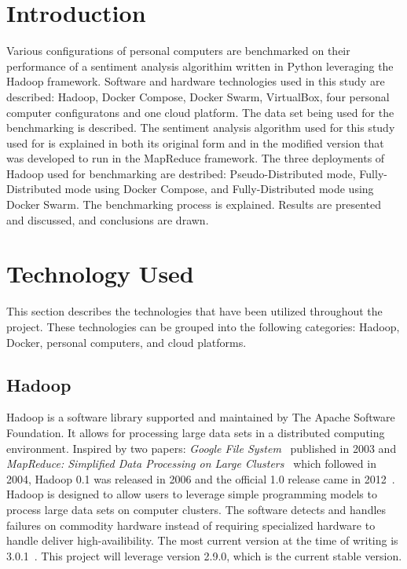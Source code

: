 \section{Introduction}\label{s:intro}
Various configurations of personal computers are benchmarked on their
performance of a sentiment analysis algorithim written in Python
leveraging the Hadoop framework. Software and hardware technologies
used in this study are described: Hadoop, Docker Compose, Docker
Swarm, VirtualBox, four personal computer configuratons and one cloud
platform. The data set being used for the benchmarking is
described. The sentiment analysis algorithm used for this study used
for is explained in both its original form and in the modified version
that was developed to run in the MapReduce framework. The three
deployments of Hadoop used for benchmarking are destribed:
Pseudo-Distributed mode, Fully-Distributed mode using Docker Compose,
and Fully-Distributed mode using Docker Swarm. The benchmarking
process is explained. Results are presented and discussed, and
conclusions are drawn.

\section{Technology Used}\label{s:techused}

This section describes the technologies that have been utilized
throughout the project. These technologies can be grouped into the
following categories: Hadoop, Docker, personal computers, and cloud
platforms.

\subsection{Hadoop}
Hadoop is a software library supported and maintained by The Apache
Software Foundation. It allows for processing large data sets in a
distributed computing environment. Inspired by two
papers: \textit{Google File
System}~\cite{hid-sp18-405-ghem2003goolefilesystem} published in 2003
and \textit{MapReduce: Simplified Data Processing on Large
Clusters}~\cite{hid-sp18-405-dean2008mapreduce} which followed in
2004, Hadoop 0.1 was released in 2006 and the official 1.0 release
came in 2012~\cite{hid-sp18-405-hadoop-wiki}. Hadoop is designed to
allow users to leverage simple programming models to process large
data sets on computer clusters. The software detects and handles
failures on commodity hardware instead of requiring specialized
hardware to handle deliver high-availibility. The most current version
at the time of writing is
3.0.1~\cite{hid-sp18-405-hadoop-official}. This project will leverage
version 2.9.0, which is the current stable version.

